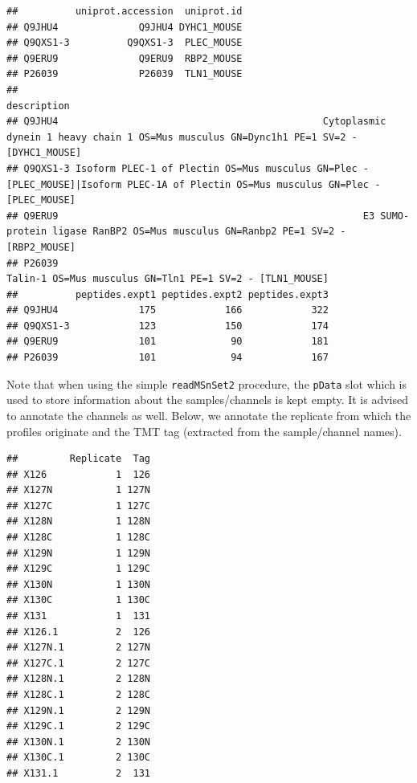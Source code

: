 \begin{verbatim}
##          uniprot.accession  uniprot.id
## Q9JHU4              Q9JHU4 DYHC1_MOUSE
## Q9QXS1-3          Q9QXS1-3  PLEC_MOUSE
## Q9ERU9              Q9ERU9  RBP2_MOUSE
## P26039              P26039  TLN1_MOUSE
##                                                                                                                                 description
## Q9JHU4                                              Cytoplasmic dynein 1 heavy chain 1 OS=Mus musculus GN=Dync1h1 PE=1 SV=2 - [DYHC1_MOUSE]
## Q9QXS1-3 Isoform PLEC-1 of Plectin OS=Mus musculus GN=Plec - [PLEC_MOUSE]|Isoform PLEC-1A of Plectin OS=Mus musculus GN=Plec - [PLEC_MOUSE]
## Q9ERU9                                                     E3 SUMO-protein ligase RanBP2 OS=Mus musculus GN=Ranbp2 PE=1 SV=2 - [RBP2_MOUSE]
## P26039                                                                             Talin-1 OS=Mus musculus GN=Tln1 PE=1 SV=2 - [TLN1_MOUSE]
##          peptides.expt1 peptides.expt2 peptides.expt3
## Q9JHU4              175            166            322
## Q9QXS1-3            123            150            174
## Q9ERU9              101             90            181
## P26039              101             94            167
\end{verbatim}

Note that when using the simple \texttt{readMSnSet2} procedure, the
\texttt{pData} slot which is used to store information about the
samples/channels is kept empty. It is advised to annotate the channels
as well. Below, we annotate the replicate from which the profiles
originate and the TMT tag (extracted from the sample/channel names).

\begin{Shaded}
\begin{Highlighting}[]
\StringTok{ }\NormalTok{(}\NormalTok{:}\NormalTok{, } \NormalTok{)}
\StringTok{ }\NormalTok{(}\CharTok{\textbackslash{}\textbackslash{}}\NormalTok{, }\NormalTok{, }\NormalTok{(}\NormalTok{, }\NormalTok{, }
\end{Highlighting}
\end{Shaded}

\begin{verbatim}
##         Replicate  Tag
## X126            1  126
## X127N           1 127N
## X127C           1 127C
## X128N           1 128N
## X128C           1 128C
## X129N           1 129N
## X129C           1 129C
## X130N           1 130N
## X130C           1 130C
## X131            1  131
## X126.1          2  126
## X127N.1         2 127N
## X127C.1         2 127C
## X128N.1         2 128N
## X128C.1         2 128C
## X129N.1         2 129N
## X129C.1         2 129C
## X130N.1         2 130N
## X130C.1         2 130C
## X131.1          2  131
\end{verbatim}

